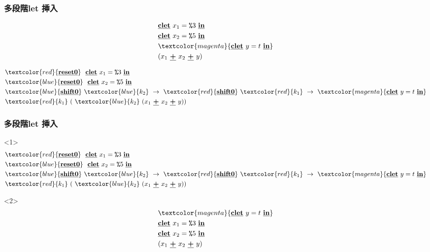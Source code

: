 \documentclass[dvipdfmx,cjk,xcolor=dvipsnames,envcountsect,notheorems,12pt]{beamer}
\newcommand\cResetz{\underline{\textbf{reset0}}}
\newcommand\cShiftz{\underline{\textbf{shift0}}}
\newcommand\cPlus{\underline{\textbf{+}}}
\newcommand\cLet{\underline{\textbf{clet}}}
\newcommand\cIn{\underline{\textbf{in}}}
\newcommand\csp[1]{\texttt{\%}{#1}}
\newcommand\red[1]{\textcolor{red}{#1}}
\newcommand\magenta[1]{\textcolor{magenta}{#1}}
\newcommand\blue[1]{\textcolor{blue}{#1}}
\theoremstyle{definition}
\begin{document}
\begin{frame}[fragile]
  \frametitle{多段階let 挿入}
  \begin{align*}
    & \cLet~x_1=\csp{3}~\cIn \\
    & \cLet~x_2=\csp{5}~\cIn \\
    & \magenta{\cLet~y=t~\cIn} \\
    & (x_1~\cPlus~x_2~\cPlus~y)
  \end{align*}

  \pause

  \begin{align*}
    & \red{\cResetz} ~~\cLet~x_1=\csp{3}~\cIn \\
    & \blue{\cResetz} ~~\cLet~x_2=\csp{5}~\cIn \\
    & \blue{\cShiftz}~\blue{k_2}~\to~ \red{\cShiftz}~\red{k_1}~\to~ \magenta{\cLet~y=t~\cIn} \\
    & \red{k_1}~(~\blue{k_2}~(x_1~\cPlus~x_2~\cPlus~y))
  \end{align*}
\end{frame}

\begin{frame}[fragile]
  \frametitle{多段階let 挿入}
  \begin{onlyenv}<1>
    \begin{align*}
      & \red{\cResetz} ~~\cLet~x_1=\csp{3}~\cIn \\
      & \blue{\cResetz} ~~\cLet~x_2=\csp{5}~\cIn \\
      & \blue{\cShiftz}~\blue{k_2}~\to~ \red{\cShiftz}~\red{k_1}~\to~ \magenta{\cLet~y=t~\cIn} \\
      & \red{k_1}~(~\blue{k_2}~(x_1~\cPlus~x_2~\cPlus~y))
    \end{align*}
  \end{onlyenv}

  \begin{onlyenv}<2>
    \begin{align*}
      & \magenta{\cLet~y=t~\cIn} \\
      & \cLet~x_1=\csp{3}~\cIn \\
      & \cLet~x_2=\csp{5}~\cIn \\
      & (x_1~\cPlus~x_2~\cPlus~y)
    \end{align*}
  \end{onlyenv}
\end{frame}
\end{document}
